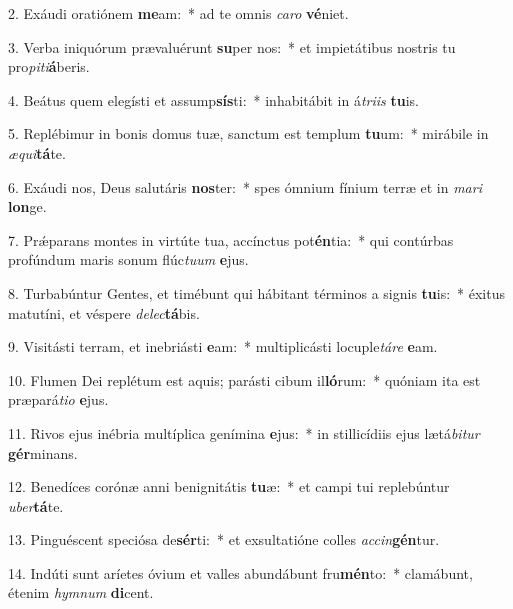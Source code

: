 2. Exáudi oratiónem \textbf{me}am:~*  ad te omnis \textit{ca}\textit{ro} \textbf{vé}niet.\

3. Verba iniquórum prævaluérunt \textbf{su}per nos:~*  et impietátibus nostris tu pro\textit{pi}\textit{ti}\textbf{á}beris.\

4. Beátus quem elegísti et assump\textbf{sís}ti:~*  inhabitábit in á\textit{tri}\textit{is} \textbf{tu}is.\

5. Replébimur in bonis domus tuæ, sanctum est templum \textbf{tu}um:~*  mirábile in \textit{æ}\textit{qui}\textbf{tá}te.\

6. Exáudi nos, Deus salutáris \textbf{nos}ter:~*  spes ómnium fínium terræ et in \textit{ma}\textit{ri} \textbf{lon}ge.\

7. Prǽparans montes in virtúte tua, accínctus pot\textbf{én}tia:~*  qui contúrbas profúndum maris sonum flúc\textit{tu}\textit{um} \textbf{e}jus.\

8. Turbabúntur Gentes, et timébunt qui hábitant términos a signis \textbf{tu}is:~*  éxitus matutíni, et véspere \textit{de}\textit{lec}\textbf{tá}bis.\

9. Visitásti terram, et inebriásti \textbf{e}am:~*  multiplicásti locuple\textit{tá}\textit{re} \textbf{e}am.\

10. Flumen Dei replétum est aquis; parásti cibum il\textbf{ló}rum:~*  quóniam ita est præpará\textit{ti}\textit{o} \textbf{e}jus.\

11. Rivos ejus inébria multíplica genímina \textbf{e}jus:~*  in stillicídiis ejus lætá\textit{bi}\textit{tur} \textbf{gér}minans.\

12. Benedíces corónæ anni benignitátis \textbf{tu}æ:~*  et campi tui replebúntur \textit{u}\textit{ber}\textbf{tá}te.\

13. Pinguéscent speciósa de\textbf{sér}ti:~*  et exsultatióne colles \textit{ac}\textit{cin}\textbf{gén}tur.\

14. Indúti sunt aríetes óvium et valles abundábunt fru\textbf{mén}to:~*  clamábunt, étenim \textit{hym}\textit{num} \textbf{di}cent.\


